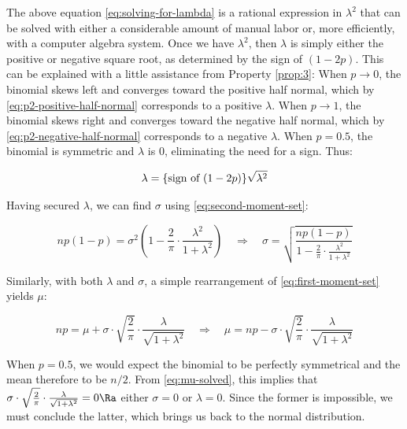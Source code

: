 \documentclass{article}
\begin{document}
The above equation \eqref{eq:solving-for-lambda} is a rational expression in
$\lambda^2$ that can be solved with either a considerable amount of manual
labor or, more efficiently, with a computer algebra system. Once we have
$\lambda^2$, then $\lambda$ is simply either the positive or negative square
root, as determined by the sign of $(1-2p)$. This can be explained with a
little assistance from Property \ref{prop:3}: When $p \to 0$, the binomial
skews left and converges toward the positive half normal, which by
\eqref{eq:p2-positive-half-normal} corresponds to a positive $\lambda$. When $p
\to 1$, the binomial skews right and converges toward the negative half normal,
which by \eqref{eq:p2-negative-half-normal} corresponds to a negative
$\lambda$. When $p = 0.5$, the binomial is symmetric and $\lambda$ is 0,
eliminating the need for a sign. Thus:

\begin{equation}
  \label{eq:lambda-solved}
  \lambda = \textnormal{\{sign of $(1-2p)$\}} \sqrt{\lambda^2}
\end{equation}


Having secured $\lambda$, we can find $\sigma$ using
\eqref{eq:second-moment-set}:

\begin{equation}
  \label{eq:sigma-solved}
  np(1-p) = \sigma^2 \left( 1 - \frac{2}{\pi} \cdot \frac{\lambda^2}{1 + \lambda^2} \right) \quad\Rightarrow\quad
  \sigma = \sqrt{\frac{np(1-p)}{1 - \frac{2}{\pi} \cdot \frac{\lambda^2}{1 + \lambda^2}}}
\end{equation}

Similarly, with both $\lambda$ and $\sigma$, a simple rearrangement of
\eqref{eq:first-moment-set} yields $\mu$:

\begin{equation}
  \label{eq:mu-solved}
  np = \mu + \sigma \cdot \sqrt{\frac{2}{\pi}} \cdot \frac{\lambda}{\sqrt{1 + \lambda^2}} \quad\Rightarrow\quad
  \mu = np - \sigma \cdot \sqrt{\frac{2}{\pi}} \cdot \frac{\lambda}{\sqrt{1 + \lambda^2}}
\end{equation}

When $p = 0.5$, we would expect the binomial to be perfectly symmetrical and
the mean therefore to be $n/2$. From \eqref{eq:mu-solved}, this implies that
$\sigma \cdot \sqrt{\frac{2}{\pi}} \cdot \frac{\lambda}{\sqrt{1 + \lambda^2}} =
0 \Ra$ either $\sigma = 0$ or $\lambda = 0$. Since the former is impossible, we
must conclude the latter, which brings us back to the normal distribution.
\end{document}

